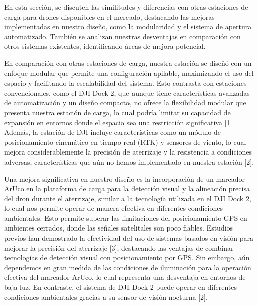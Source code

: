 
En esta sección, se discuten las similitudes y diferencias con otras estaciones de carga para drones disponibles en el mercado, destacando las mejoras implementadas en nuestro diseño, como la modularidad y el sistema de apertura automatizado. También se analizan nuestras desventajas en comparación con otros sistemas existentes, identificando áreas de mejora potencial.

En comparación con otras estaciones de carga, nuestra estación se diseñó con un enfoque modular que permite una configuración apilable, maximizando el uso del espacio y facilitando la escalabilidad del sistema. Esto contrasta con estaciones convencionales, como el DJI Dock 2, que aunque tiene características avanzadas de automatización y un diseño compacto, no ofrece la flexibilidad modular que presenta nuestra estación de carga, lo cual podría limitar su capacidad de expansión en entornos donde el espacio sea una restricción significativa [1]. Además, la estación de DJI incluye características como un módulo de posicionamiento cinemático en tiempo real (RTK) y sensores de viento, lo cual mejora considerablemente la precisión de aterrizaje y la resistencia a condiciones adversas, características que aún no hemos implementado en nuestra estación [2].

Una mejora significativa en nuestro diseño es la incorporación de un marcador ArUco en la plataforma de carga para la detección visual y la alineación precisa del dron durante el aterrizaje, similar a la tecnología utilizada en el DJI Dock 2, lo cual nos permite operar de manera efectiva en diferentes condiciones ambientales. Esto permite superar las limitaciones del posicionamiento GPS en ambientes cerrados, donde las señales satelitales son poco fiables. Estudios previos han demostrado la efectividad del uso de sistemas basados en visión para mejorar la precisión del aterrizaje [3], destacando las ventajas de combinar tecnologías de detección visual con posicionamiento por GPS. Sin embargo, aún dependemos en gran medida de las condiciones de iluminación para la operación efectiva del marcador ArUco, lo cual representa una desventaja en entornos de baja luz. En contraste, el sistema de DJI Dock 2 puede operar en diferentes condiciones ambientales gracias a su sensor de visión nocturna [2].

